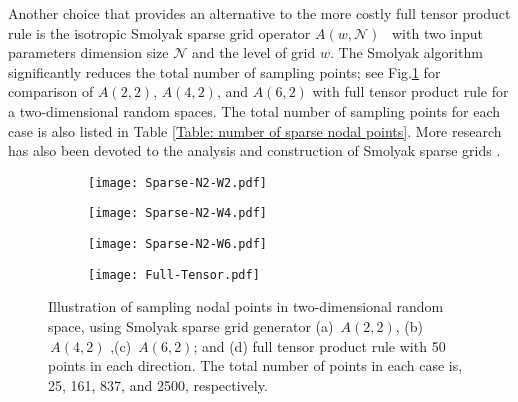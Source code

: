 Another choice that provides an alternative to the more costly full tensor product rule is the isotropic Smolyak sparse grid operator $A(w , \mathcal{N})$~\cite{Smolyak63,nobile2008sparse} with two input parameters dimension size $\mathcal{N}$ and the level of grid $w$. The Smolyak algorithm significantly reduces the total number of sampling points; see Fig.\ref{Fig: Grids} for comparison of $A(2,2)$, $A(4,2)$, and $A(6,2)$ with full tensor product rule for a two-dimensional random spaces. The total number of sampling points for each case is also listed in Table \ref{Table: number of sparse nodal points}. More research has also been devoted to the analysis and construction of Smolyak sparse grids \cite{xiu2005,barthelmann2000high,novak1999simple,novak1996high}. 


%
%
\begin{figure}[t]
	\centering
	\begin{subfigure}{0.22\textwidth}
		\centering
		\texttt{[image: Sparse-N2-W2.pdf]}
		\caption{}
	\end{subfigure}
	\begin{subfigure}{0.22\textwidth}
		\centering
		\texttt{[image: Sparse-N2-W4.pdf]}
		\caption{}
	\end{subfigure}
	\begin{subfigure}{0.22\textwidth}
		\centering
		\texttt{[image: Sparse-N2-W6.pdf]}
		\caption{}
	\end{subfigure}
	\begin{subfigure}{0.22\textwidth}
		\centering
		\texttt{[image: Full-Tensor.pdf]}
		\caption{}
	\end{subfigure}
	\caption{Illustration of sampling nodal points in two-dimensional random space, using Smolyak sparse grid generator (a) $\, A(2,2)$, (b) $\, A(4,2)$ ,(c) $\, A(6,2)$; and (d) full tensor product rule with 50 points in each direction. The total number of points in each case is, 25, 161, 837, and 2500, respectively. }
	\label{Fig: Grids}
\end{figure}
%
%




